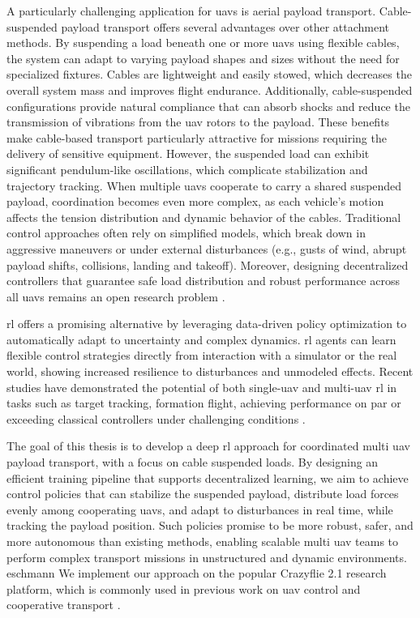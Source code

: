 A particularly challenging application for \glspl{uav} is aerial payload transport. Cable-suspended payload transport offers several advantages over other attachment methods. By suspending a load beneath one or more \glspl{uav} using flexible cables, the system can adapt to varying payload shapes and sizes without the need for specialized fixtures. Cables are lightweight and easily stowed, which decreases the overall system mass and improves flight endurance. Additionally, cable-suspended configurations provide natural compliance that can absorb shocks and reduce the transmission of vibrations from the \gls{uav} rotors to the payload. These benefits make cable-based transport particularly attractive for missions requiring the delivery of sensitive equipment. However, the suspended load can exhibit significant pendulum-like oscillations, which complicate stabilization and trajectory tracking. When multiple \glspl{uav} cooperate to carry a shared suspended payload, coordination becomes even more complex, as each vehicle's motion affects the tension distribution and dynamic behavior of the cables. Traditional control approaches often rely on simplified models, which break down in aggressive maneuvers or under external disturbances (e.g., gusts of wind, abrupt payload shifts, collisions, landing and takeoff). Moreover, designing decentralized controllers that guarantee safe load distribution and robust performance across all \glspl{uav} remains an open research problem \cite{estevez_review_2024}.

\gls{rl} offers a promising alternative by leveraging data-driven policy optimization to automatically adapt to uncertainty and complex dynamics. \gls{rl} agents can learn flexible control strategies directly from interaction with a simulator or the real world, showing increased resilience to disturbances and unmodeled effects. Recent studies have demonstrated the potential of both single-\gls{uav} and multi-\gls{uav} \gls{rl} in tasks such as target tracking, formation flight, achieving performance on par or exceeding classical controllers under challenging conditions \autocite{Hwangbo2017ControlOA, kaufmann_champion-level_2023, Song2023ReachingTL, huang_collision_2024,Eschmann2024}.

The goal of this thesis is to develop a deep \gls{rl} approach for coordinated multi \gls{uav} payload transport, with a focus on cable suspended loads. By designing an efficient training pipeline that supports decentralized learning, we aim to achieve control policies that can stabilize the suspended payload, distribute load forces evenly among cooperating \glspl{uav}, and adapt to disturbances in real time, while tracking the payload position. Such policies promise to be more robust, safer, and more autonomous than existing methods, enabling scalable multi \gls{uav} teams to perform complex transport missions in unstructured and dynamic environments.
eschmann
We implement our approach on the popular Crazyflie 2.1 research platform, which is commonly used in previous work on \gls{uav} control and cooperative transport \autocite{wahba_kinodynamic_2024,huang_collision_2024,Eschmann2024,chen_what_2024}.

